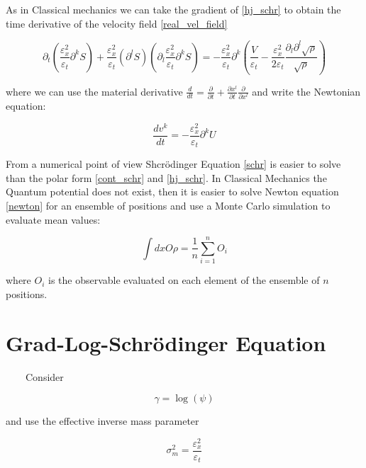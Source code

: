 \documentclass[a4paper,12pt]{article}
\begin{document}
As in Classical mechanics we can take the gradient  of \ref{hj_schr} to obtain the time derivative of the velocity field \ref{real_vel_field}

\begin{equation}\label{grad_hj_schr}
\partial_t \left( \frac{\varepsilon_x^2}{ \varepsilon_t}\partial^k S  \right) + \frac{\varepsilon_x^2}{ \varepsilon_t} ( \partial^l S) ( \partial_l \frac{\varepsilon_x^2}{ \varepsilon_t} \partial^k S)  = -  \frac{\varepsilon_x^2}{ \varepsilon_t} \partial^k \left( \frac{V}{\varepsilon_t} - \frac{\varepsilon_x^2}{2 \varepsilon_t} \frac{\partial_l \partial^l \sqrt{\rho}}{\sqrt{\rho}} \right)
\end{equation}

where we can use the material derivative $\frac{d}{dt} = \frac{\partial}{\partial t} + \frac{ \partial x^l}{\partial t } \frac{ \partial}{\partial x^l} $ and write the Newtonian equation:

\begin{equation}\label{newton}
\frac{dv^k}{dt} =  -  \frac{\varepsilon_x^2}{ \varepsilon_t} \partial^kU
\end{equation}

From a numerical point of view Shcr\"odinger Equation \ref{schr} is easier to solve than the polar form \ref{cont_schr} and \ref{hj_schr}. In Classical Mechanics the Quantum potential does not exist, then it is easier to solve Newton equation \ref{newton} for an ensemble of positions and use a Monte Carlo simulation to evaluate mean values: 

\begin{equation}\label{mc_integral}
\int dx O \rho = \frac{1}{n} \sum_{i=1}^{n} O_i  
\end{equation}

where $O_i$ is the observable evaluated on each element of the ensemble of $n$ positions.



\section{Grad-Log-Schr\"odinger Equation}

~~~~Consider 

\begin{equation}\label{log_psi}
\gamma = \log(\psi)
\end{equation}

and use the effective inverse mass parameter

\begin{equation}\label{sigmass}
\sigma_m^2 = \frac{\varepsilon_x^2}{\varepsilon_t} 
\end{equation}
\end{document}
